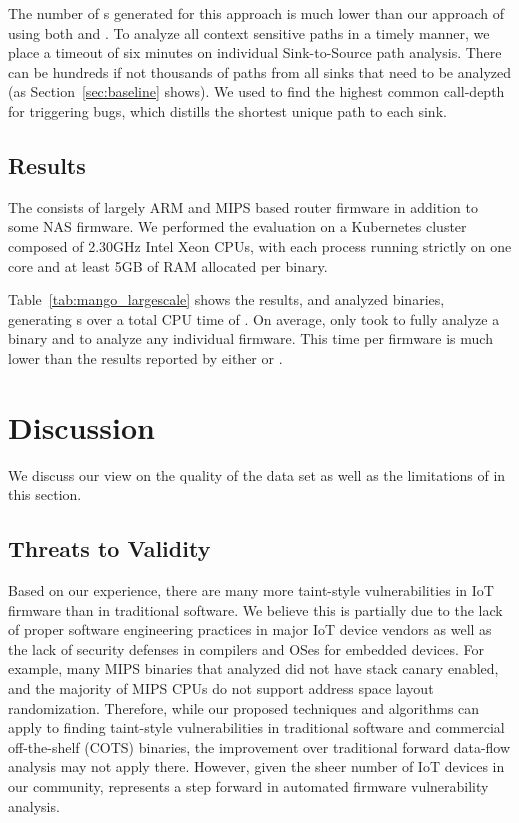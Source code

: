 The number of \trupoc{}s generated for this approach is much lower than our approach of using both \assumed and \rev.
To analyze all context sensitive paths in a timely manner, we place a timeout of six minutes on individual Sink-to-Source path analysis.
There can be hundreds if not thousands of paths from all sinks that need to be analyzed (as Section~\ref{sec:baseline} shows).
We used \rev to find the highest common call-depth for triggering bugs, which distills the shortest unique path to each sink.

\subsection{\largeScaleDataset Results}



The \largeScaleDataset consists of largely ARM and MIPS based router firmware in addition to some NAS firmware.
We performed the evaluation on a Kubernetes cluster composed of 2.30GHz Intel Xeon CPUs, with each process running strictly on one core and at least 5GB of RAM allocated per binary.

Table~\ref{tab:mango_largescale} shows the results, and \mango analyzed \greenhouseTotalTotal binaries, generating \greenhouseTotalAlerts \trupoc{}s over a total CPU time of \greenhouseTotalTime.
On average, \mango only took \greenhouseTotalAVGBinTime to fully analyze a binary and \greenhouseTotalAVGTime to analyze any individual firmware.
This time per firmware is much lower than the results reported by either \satc or \karonte.


\section{Discussion}
\label{sec:discussion}

We discuss our view on the quality of the data set as well as the limitations of \mango in this section.

\subsection{Threats to Validity}

Based on our experience, there are many more taint-style vulnerabilities in IoT firmware than in traditional software.
We believe this is partially due to the lack of proper software engineering practices in major IoT device vendors as well as the lack of security defenses in compilers and OSes for embedded devices.
For example, many MIPS binaries that \mango analyzed did not have stack canary enabled, and the majority of MIPS CPUs do not support address space layout randomization.
Therefore, while our proposed techniques and algorithms can apply to finding taint-style vulnerabilities in traditional software and commercial off-the-shelf (COTS) binaries, the improvement over traditional forward data-flow analysis may not apply there.
However, given the sheer number of IoT devices in our community, \mango represents a step forward in automated firmware vulnerability analysis.

